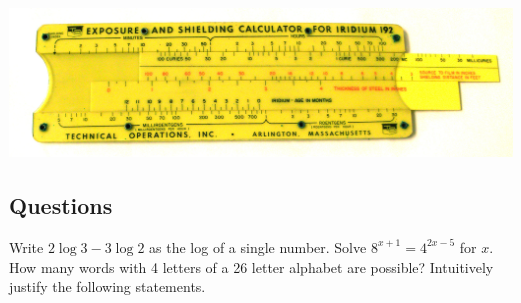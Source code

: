\begin{center}
  \includegraphics[width=\textwidth]{sliderule}
\end{center}

\clearpage
\subsection*{Questions}
\begin{questions}
  \question Write $ 2 \log 3 - 3 \log 2 $ as the log of a single number.
  \question Solve $ 8^{x + 1} = 4^{2x - 5} $ for $ x $.
  \question How many words with 4 letters of a 26 letter alphabet are possible?
  \question Intuitively justify the following statements.
\end{questions}
